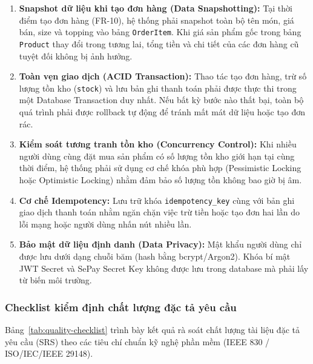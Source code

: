 \documentclass[a4paper]{article}
\begin{document}
\begin{enumerate}
    \item \textbf{Snapshot dữ liệu khi tạo đơn hàng (Data Snapshotting):} Tại thời điểm tạo đơn hàng (FR-10), hệ thống phải snapshot toàn bộ tên món, giá bán, size và topping vào bảng \texttt{OrderItem}. Khi giá sản phẩm gốc trong bảng \texttt{Product} thay đổi trong tương lai, tổng tiền và chi tiết của các đơn hàng cũ tuyệt đối không bị ảnh hưởng.
    \item \textbf{Toàn vẹn giao dịch (ACID Transaction):} Thao tác tạo đơn hàng, trừ số lượng tồn kho (\texttt{stock}) và lưu bản ghi thanh toán phải được thực thi trong một Database Transaction duy nhất. Nếu bất kỳ bước nào thất bại, toàn bộ quá trình phải được rollback tự động để tránh mất mát dữ liệu hoặc tạo đơn rác.
    \item \textbf{Kiểm soát tương tranh tồn kho (Concurrency Control):} Khi nhiều người dùng cùng đặt mua sản phẩm có số lượng tồn kho giới hạn tại cùng thời điểm, hệ thống phải sử dụng cơ chế khóa phù hợp (Pessimistic Locking hoặc Optimistic Locking) nhằm đảm bảo số lượng tồn không bao giờ bị âm.
    \item \textbf{Cơ chế Idempotency:} Lưu trữ khóa \texttt{idempotency\_key} cùng với bản ghi giao dịch thanh toán nhằm ngăn chặn việc trừ tiền hoặc tạo đơn hai lần do lỗi mạng hoặc người dùng nhấn nút nhiều lần.
    \item \textbf{Bảo mật dữ liệu định danh (Data Privacy):} Mật khẩu người dùng chỉ được lưu dưới dạng chuỗi băm (hash bằng bcrypt/Argon2). Khóa bí mật JWT Secret và SePay Secret Key không được lưu trong database mà phải lấy từ biến môi trường.
\end{enumerate}

\subsubsection{Checklist kiểm định chất lượng đặc tả yêu cầu}

Bảng~\ref{tab:quality-checklist} trình bày kết quả rà soát chất lượng tài liệu đặc tả yêu cầu (SRS) theo các tiêu chí chuẩn kỹ nghệ phần mềm (IEEE 830 / ISO/IEC/IEEE 29148).
\end{document}
